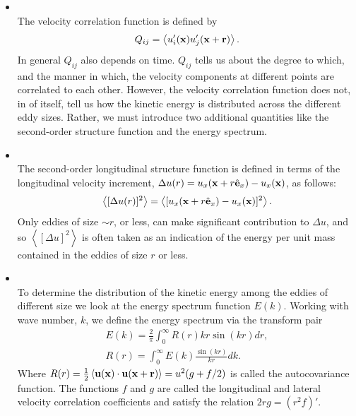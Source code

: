 \begin{itemize}
\item{}\\ The velocity correlation function is defined by
\begin{equation}
\label{eq-velocity_correlation}
Q_{ij}=\left\langle u_i'({\bf x})u_j'({\bf x}+{\bf r})\right\rangle.
\end{equation}
In general $Q_{ij}$ also depends on time. $Q_{ij}$ tells us about the degree to which, and the manner in which, the velocity components at different points are correlated to each other. However, the velocity correlation function does not, in of itself, tell us how the kinetic energy is distributed across the different eddy sizes. Rather, we must introduce two additional quantities like the second-order structure function and the energy spectrum.
\item{}\\ The second-order longitudinal structure function is defined in terms of the longitudinal velocity increment, $\Delta u(r)=u_x({\bf x}+r\hat{{\bf e}}_x)-u_x({\bf x})$, as follows:
\begin{equation}
\label{eq-second_order_structure}
\left\langle[\Delta u(r)]^2\right\rangle=\left\langle[u_x({\bf x}+r\hat{{\bf e}}_x)-u_x({\bf x})]^2\right\rangle.
\end{equation}
Only eddies of size $\sim r$, or less, can make significant contribution to $\Delta u$, and so $\left\langle[\Delta u]^2\right\rangle$ is often taken as an indication of the energy per unit mass contained in the eddies of size $r$ or less. 
\item{}\\ To determine the distribution of the kinetic energy among the eddies of different size we look at the energy spectrum function $E(k)$. Working with wave number, $k$, we define the energy spectrum via the transform pair
\begin{align}
\label{eq-energy_spectrum}
E(k)=\frac{2}{\pi}\int_0^\infty R(r)kr\sin(kr)dr,\\
\label{eq-autocovariance}
R(r)=\int_0^\infty E(k)\frac{\sin(kr)}{kr}dk.
\end{align}
Where $R(r)=\frac{1}{2}\left\langle{\bf u}({\bf x})\cdot{\bf u}({\bf x}+{\bf r})\right\rangle=u^2(g+f/2)$ is called the autocovariance function. The functions $f$ and $g$ are called the longitudinal and lateral velocity correlation coefficients and satisfy the relation $2rg=(r^2f)'$.


\end{itemize}
